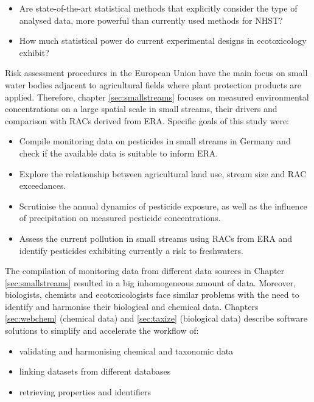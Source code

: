 \begin{itemize}
	\item Are state-of-the-art statistical methods that explicitly consider the type of analysed data, more powerful than currently used methods for NHST?
	\item How much statistical power do current experimental designs in ecotoxicology exhibit?
\end{itemize}


\noindent Risk assessment procedures in the European Union have the main focus on small water bodies adjacent to agricultural fields where plant protection products are applied.
Therefore, chapter \ref{sec:smallstreams} focuses on measured environmental concentrations on a large spatial scale in small streams, their drivers and comparison with RACs derived from ERA.
Specific goals of this study were:
\begin{itemize}
	\item Compile monitoring data on pesticides in small streams in Germany and check if the available data is suitable to inform ERA.
	\item Explore the relationship between agricultural land use, stream size and RAC exceedances.
	\item Scrutinise the annual dynamics of pesticide exposure, as well as the influence of precipitation on measured pesticide concentrations.
	\item Assess the current pollution in small streams using RACs from ERA and identify pesticides exhibiting currently a risk to freshwaters.
\end{itemize}

\noindent
The compilation of monitoring data from different data sources in Chapter \ref{sec:smallstreams} resulted in a big inhomogeneous amount of data.
Moreover, biologists, chemists and ecotoxicologists face similar problems with the need to identify and harmonise their biological and chemical data.
Chapters \ref{sec:webchem} (chemical data) and \ref{sec:taxize} (biological data) describe software solutions to simplify and accelerate the workflow of:

\begin{itemize}
	\item validating and harmonising chemical and taxonomic data
	\item linking datasets from different databases
	\item retrieving properties and identifiers
\end{itemize}



